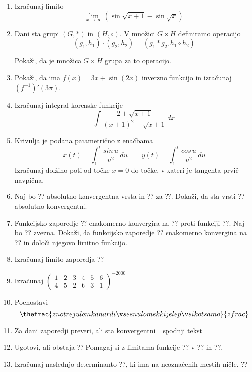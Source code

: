\documentclass[a4paper,12pt]{article}
\begin{document}
\begin{enumerate}
\item
Izračunaj limito $$\lim_{x\to\infty}(\sin\sqrt{x+1}-\sin\sqrt{x}) $$

\item
Dani sta grupi $(G, \ast) $ in $(H, \circ )$. V množici $G \times H$ definiramo operacijo
 $$(g_1,h_1)\cdot (g_2,h_2)=(g_1\ast g_2,h_1 \circ h_2) $$

Pokaži, da je množica  $G \times H$ grupa za to operacijo.

\item
Pokaži, da ima $f(x)=3x+\sin(2x)$ inverzno funkcijo in izračunaj $(f^{-1})'(3\pi)$.

\item
Izračunaj integral korenske funkcije
$$\int \frac{2+\sqrt{x+1}}{(x+1)^2 - \sqrt{x+1}}\,dx $$

\item
Krivulja je podana parametrično z enačbama
$$x(t)=\int_1^t \frac{sin\,u}{u^2}\,du  \qquad y(t)=\int_1^t \frac{cos\,u}{u^2}\,du $$
Izračunaj dolžino poti od točke $x=0$ do točke, v kateri je tangenta prvič navpična.

\item
Naj bo ?? absolutno konvergentna vrsta in ?? za ??.
Dokaži, da sta vrsti
??
absolutno konvergentni.

\item
Funkcijsko zaporedje ?? enakomerno konvergira na ?? proti funkciji ??.
Naj bo ?? zvezna. Dokaži, da funkcijsko zaporedje ??
enakomerno konvergina na ?? in določi njegovo limitno funkcijo.

\item
Izračunaj limito zaporedja
??

\item
Izračunaj
$
\left(
\begin{array}{cccccc}
	1&2&3&4&5&6\\
	4&5&2&6&3&1
\end{array}
\right)^{-2000}
$

\item
Poenostavi
$$
\thefrac{znotrej ulomka nardi še en ulomek ki je lepši kot samo}{z frac}
$$

\item
Za dani zaporedji preveri, ali sta konvergentni
_{spodnji tekst}

\item
Ugotovi, ali obstaja
??
Pomagaj si z limitama funkcije ?? v ?? in ??.

\item
Izračunaj naslednjo determinanto ??, ki ima na neoznačenih mestih ničle.
??


\end{enumerate}
\end{document}
